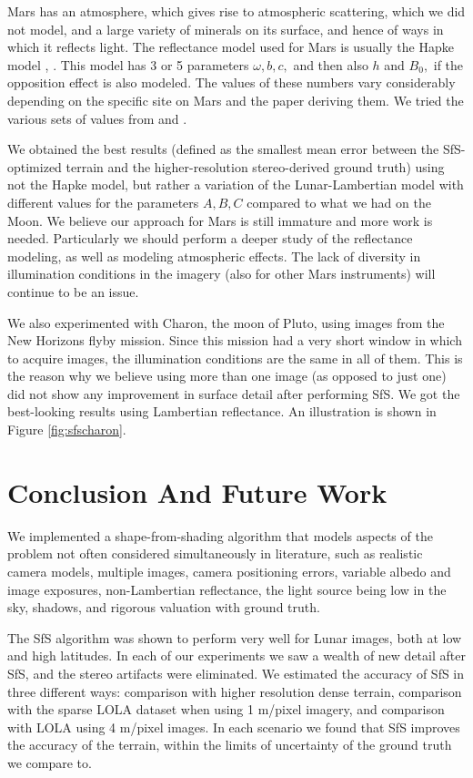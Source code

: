 \documentclass[12pt,oneside]{article}
\begin{document}
Mars has an atmosphere, which gives rise to atmospheric scattering,
which we did not model, and a large variety of minerals on its surface,
and hence of ways in which it reflects light. The reflectance model used for 
Mars is usually the Hapke model \cite{hapke2008bidirectional}, \cite{hapke1993opposition}.
This model has 3 or 5 parameters $\omega, b, c,$ and then also $h$ and $B_0,$ 
if the opposition effect is also modeled. The values of these numbers vary considerably
depending on the specific site on Mars and the paper deriving them. We tried 
the various sets of values from \cite{johnson2006spectrophotometric} and \cite{fernando2013surface}.

We obtained the best results (defined as the smallest mean error between the
SfS-optimized terrain and the higher-resolution stereo-derived ground truth) using not the Hapke model,
but rather a variation of the Lunar-Lambertian model with different
values for the parameters $A, B, C$ compared to what we had on the Moon.
We believe our approach for Mars is still immature and more work is
needed. Particularly we should perform a deeper study of the
reflectance modeling, as well as modeling atmospheric effects. The lack of diversity 
in illumination conditions in the imagery (also for other Mars instruments) will continue to be an issue.

We also experimented with Charon, the moon of Pluto, using images from
the New Horizons flyby mission. Since this mission had a very short
window in which to acquire images, the illumination conditions are the
same in all of them. This is the reason why we believe using more than
one image (as opposed to just one) did not show any improvement in
surface detail after performing SfS. We got the best-looking results
using Lambertian reflectance. An illustration is shown in Figure
\ref{fig:sfscharon}.

\section{Conclusion And Future Work}

We implemented a shape-from-shading algorithm that models aspects of the
problem not often considered simultaneously in literature, such as
realistic camera models, multiple images, camera positioning errors,
variable albedo and image exposures, non-Lambertian reflectance, the
light source being low in the sky, shadows, and rigorous valuation with
ground truth. 

The SfS algorithm was shown to perform very well for Lunar images, both
at low and high latitudes. In each of our experiments we saw a wealth
of new detail after SfS, and the stereo artifacts were eliminated. We
estimated the accuracy of SfS in three different ways: comparison with
higher resolution dense terrain, comparison with the sparse LOLA dataset
when using 1 m/pixel imagery, and comparison with LOLA using 4 m/pixel
images. In each scenario we found that SfS improves the accuracy of the
terrain, within the limits of uncertainty of the ground truth we compare
to.
\end{document}
